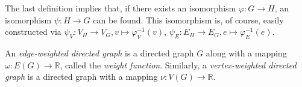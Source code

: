 \begin{remark}
  The last definition implies that, if there exists an isomorphism
  $\varphi: G \to H$, an isomorphism $\psi: H \to G$ can be
  found. This isomorphism is, of course, easily constructed via
  $\psi_V: V_H \to V_G, v \mapsto \varphi_V^{-1}(v)$, $\psi_E: E_H \to
  E_G, e \mapsto \varphi_E^{-1}(e)$.
\end{remark}

\begin{definition}
  An \textit{edge-weighted directed graph} is a directed graph $G$ along
  with a mapping $\omega: E(G) \to \mathbb{R}$, called the
  \textit{weight function}. Similarly, a \textit{vertex-weighted
    directed graph} is a directed graph with a mapping $\nu: V(G) \to
  \mathbb{R}$.
\end{definition}















